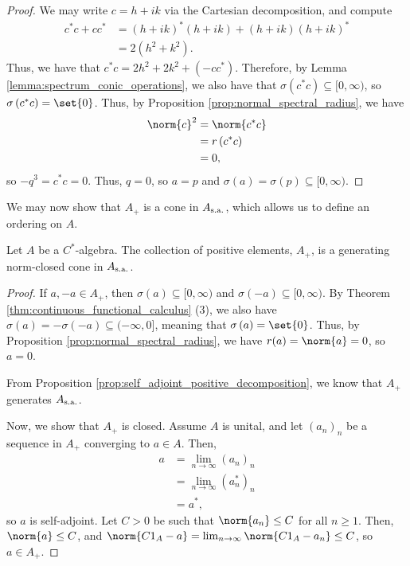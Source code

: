 \begin{proof}
  We may write $c = h + ik$ via the Cartesian decomposition, and compute
  \begin{align*}
    c^{\ast}c + cc^{\ast} &= \left( h + ik \right)^{\ast}\left( h + ik \right) + \left( h + ik \right)\left( h + ik \right)^{\ast}\\
                          &= 2\left( h^2 + k^2 \right).
  \end{align*}
  Thus, we have that $c^{\ast}c = 2h^2 + 2k^2 + \left( -cc^{\ast} \right)$. Therefore, by Lemma \ref{lemma:spectrum_conic_operations}, we also have that $\sigma\left( c^{\ast}c \right)\subseteq [0,\infty)$, so $\sigma\left( c^{\ast}c \right) = \set{0}$. Thus, by Proposition \ref{prop:normal_spectral_radius}, we have
  \begin{align*}
    \norm{c}^2 &= \norm{c^{\ast}c}\\
               &= r\left( c^{\ast}c \right)\\
               &= 0,
  \end{align*}
  so $-q^3 = c^{\ast}c = 0$. Thus, $q = 0$, so $a = p$ and $\sigma\left( a \right) = \sigma\left( p \right)\subseteq [0,\infty)$.
\end{proof}
We may now show that $A_{+}$ is a cone in $A_{\operatorname{s.a.}}$, which allows us to define an ordering on $A$.
\begin{corollary}
  Let $A$ be a $C^{\ast}$-algebra. The collection of positive elements, $A_{+}$, is a generating norm-closed cone in $A_{\operatorname{s.a.}}$.
\end{corollary}
\begin{proof}
  If $a,-a\in A_{+}$, then $\sigma\left( a \right)\subseteq [0,\infty)$ and $\sigma\left( -a \right) \subseteq [0,\infty)$. By Theorem \ref{thm:continuous_functional_calculus} (3), we also have $\sigma\left( a \right) = -\sigma\left( -a \right)\subseteq (-\infty,0]$, meaning that $\sigma\left( a \right) = \set{0}$. Thus, by Proposition \ref{prop:normal_spectral_radius}, we have $r(a) = \norm{a} = 0$, so $a = 0$.\newline

  From Proposition \ref{prop:self_adjoint_positive_decomposition}, we know that $A_{+}$ generates $A_{\operatorname{s.a.}}$.\newline

  Now, we show that $A_{+}$ is closed. Assume $A$ is unital, and let $\left( a_n \right)_n$ be a sequence in $A_{+}$ converging to $a\in A$. Then,
  \begin{align*}
    a &= \lim_{n\rightarrow\infty}\left( a_n \right)_n\\
      &= \lim_{n\rightarrow\infty}\left( a_n^{\ast} \right)_n\\
      &= a^{\ast},
  \end{align*}
  so $a$ is self-adjoint. Let $C > 0$ be such that $\norm{a_n}\leq C$ for all $n\geq 1$. Then, $\norm{a}\leq C$, and $\norm{C1_A - a} = \lim_{n\rightarrow\infty}\norm{C1_A - a_n}\leq C$, so $a\in A_{+}$.
\end{proof}
